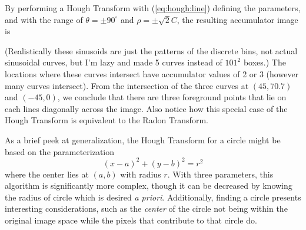 By performing a Hough Transform with (\ref{eq:hough:line}) defining the parameters, and with the range of $\theta = \pm 90 ^{\circ}$ and $\rho = \pm \sqrt{2}C$, the resulting accumulator image is
\begin{center}
\end{center}
(Realistically these sinusoids are just the patterns of the discrete bins, not actual sinusoidal curves, but I'm lazy and made 5 curves instead of $101^2$ boxes.) The locations where these curves intersect have accumulator values of 2 or 3 (however many curves intersect). From the intersection of the three curves at $(45, 70.7)$ and $(-45, 0)$, we conclude that there are three foreground points that lie on each lines diagonally across the image. Also notice how this special case of the Hough Transform is equivalent to the Radon Transform.

As a brief peek at generalization, the Hough Transform for a circle might be based on the parameterization
\begin{equation}
(x-a)^2 + (y-b)^2=r^2 \label{eq:hough:circle}
\end{equation}
where the center lies at $(a,b)$ with radius $r$. With three parameters, this algorithm is significantly more complex, though it can be decreased by knowing the radius of circle which is desired \textit{a priori}. Additionally, finding a circle presents interesting considerations, such as the \textit{center} of the circle not being within the original image space while the pixels that contribute to that circle do.